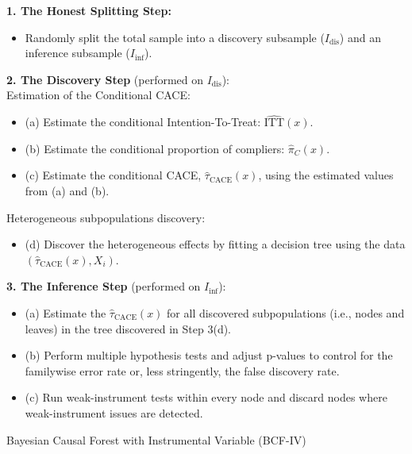 \begin{algorithm}[H]
    \footnotesize
    \DontPrintSemicolon
    \SetAlgoLined
    \LinesNotNumbered
    \BlankLine
    \textbf{1. The Honest Splitting Step:} \\
    \begin{itemize}
        \item Randomly split the total sample into a discovery subsample ($I_{\text{dis}}$) and an inference subsample ($I_{\text{inf}}$).
    \end{itemize}
    \BlankLine
    \textbf{2. The Discovery Step} (performed on $I_{\text{dis}}$): \\
    Estimation of the Conditional CACE:
    \begin{itemize}
        \item (a) Estimate the conditional Intention-To-Treat: $\widehat{\text{ITT}}(x)$.
        \item (b) Estimate the conditional proportion of compliers: $\widehat{\pi}_C(x)$.
        \item (c) Estimate the conditional CACE, $\widehat{\tau}_{\text{CACE}}(x)$, using the estimated values from (a) and (b).
    \end{itemize}
    Heterogeneous subpopulations discovery:
    \begin{itemize}
        \item (d) Discover the heterogeneous effects by fitting a decision tree using the data $(\widehat{\tau}_{\text{CACE}}(x), X_i)$.
    \end{itemize}
    \BlankLine
    \textbf{3. The Inference Step} (performed on $I_{\text{inf}}$): \\
    \begin{itemize}
        \item (a) Estimate the $\widehat{\tau}_{\text{CACE}}(x)$ for all discovered subpopulations (i.e., nodes and leaves) in the tree discovered in Step 3(d).
        \item (b) Perform multiple hypothesis tests and adjust p-values to control for the familywise error rate or, less stringently, the false discovery rate. 
        \item (c) Run weak-instrument tests within every node and discard nodes where weak-instrument issues are detected.
    \end{itemize}
    \caption{Bayesian Causal Forest with Instrumental Variable (BCF-IV)}
    \label{algo:BCF-IV}
\end{algorithm}


